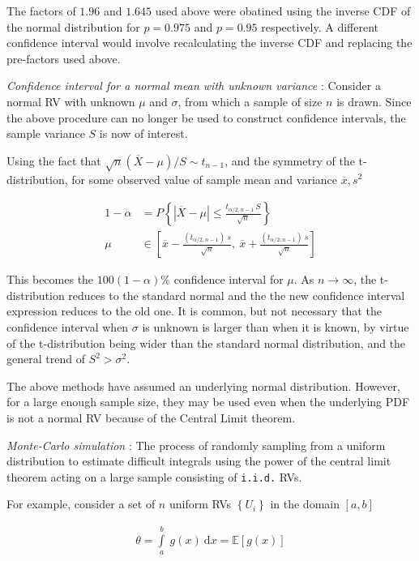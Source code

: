 The factors of $ 1.96 $ and $ 1.645 $ used above were obatined using the inverse CDF of the normal distribution for $ p = 0.975 $ and $ p = 0.95 $ respectively. A different confidence interval would involve recalculating the inverse CDF and replacing the pre-factors used above.

\textit{Confidence interval for a normal mean with unknown variance} : Consider a normal RV with unknown $ \mu $ and $ \sigma $, from which a sample of size $ n $ is drawn. Since the above procedure can no longer be used to construct confidence intervals, the sample variance $ S $ is now of interest.

Using the fact that $ \sqrt{n}(\overline{X} - \mu) / S \sim t_{n-1}$, and the symmetry of the t-distribution, for some observed value of sample mean and variance $ \overline{x}, s^2 $


\begin{align}
	1 - \alpha &= P \left\{ | \overline{X} - \mu | \leq \frac{t_{\alpha/2, n-1}\ S}{\sqrt{n}} \right\}  \nonumber \\
	\mu &\in \left[ \overline{x} - \frac{(t_{\alpha/2, n-1})\ s}{\sqrt{n}}, \ \overline{x} + \frac{(t_{\alpha/2, n-1})\ s}{\sqrt{n}} \right]
\end{align}

This becomes the $ 100(1-\alpha) \% $ confidence interval for $ \mu $. As $ n \to \infty $, the t-distribution reduces to the standard normal and the the new confidence interval expression reduces to the old one. It is common, but not necessary that the confidence interval when $ \sigma $ is unknown is larger than when it is known, by virtue of the t-distribution being wider than the standard normal distribution, and the general trend of $ S^2 > \sigma^2 $.

The above methods have assumed an underlying normal distribution. However, for a large enough sample size, they may be used even when the underlying PDF is not a normal RV because of the Central Limit theorem.


\textit{Monte-Carlo simulation} : The process of randomly sampling from a uniform distribution to estimate difficult integrals using the power of the central limit theorem acting on a large sample consisting of \texttt{i.i.d.} RVs.

For example, consider a set of $ n $ uniform RVs $ \left\{U_i\right\} $ in the domain $ [a,b] $ 

\begin{align}
	\theta = \int\limits_{a}^{b}\ g(x)\ \mathrm{d}x = \mathbb{E}[g(x)]
\end{align}

